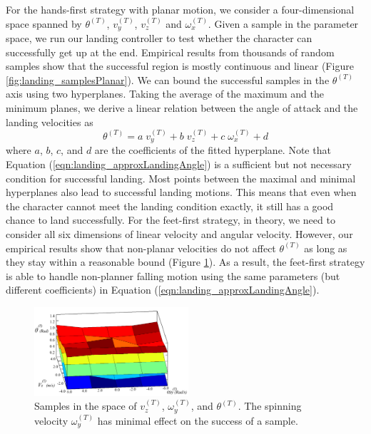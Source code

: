 For the hands-first strategy with planar motion, we consider a
four-dimensional space spanned by $\theta^{(T)}$, $v_y^{(T)}$,
$v_z^{(T)}$ and $\omega_x^{(T)}$. Given a sample in the parameter
space, we run our landing controller to test whether the character can
successfully get up at the end. Empirical results from thousands of
random samples show that the successful region is mostly continuous
and linear (Figure \ref{fig:landing_samplesPlanar}). We can bound the
successful samples in the $\theta^{(T)}$ axis using two hyperplanes.
Taking the average of the maximum and the minimum planes, we derive a
linear relation between the angle of attack and the landing velocities as
\begin{equation}
\label{eqn:landing_approxLandingAngle}
\theta ^{(T)} = a \;v_y^{(T)} + b \;v_z^{(T)} + c \;\omega_x^{(T)} + d
\end{equation}
where $a$, $b$, $c$, and $d$ are the coefficients of the fitted
hyperplane. Note that Equation (\ref{eqn:landing_approxLandingAngle}) is a
sufficient but not necessary condition for successful landing. Most
points between the maximal and minimal hyperplanes also lead to
successful landing motions. This means that even when the character
cannot meet the landing condition exactly, it still has a good chance
to land successfully. For the feet-first strategy, in theory, we need
to consider all six dimensions of linear velocity and angular
velocity. However, our empirical results show that non-planar
velocities do not affect $\theta^{(T)}$ as long as they stay within a
reasonable bound (Figure \ref{fig:landing_sampleNonPlanar}). As a result, the
feet-first strategy is able to handle non-planner falling motion using
the same parameters (but different coefficients) in Equation
(\ref{eqn:landing_approxLandingAngle}).

\begin{figure}[ht]
\center
  \includegraphics[width=0.51\textwidth]{images/sampleWYflat}
  \caption{
    Samples in the space of $v_z^{(T)}$, $\omega_y^{(T)}$, and
    $\theta^{(T)}$. The spinning velocity $\omega_y^{(T)}$
    has minimal effect on the success of a sample.
  }
 \label{fig:landing_sampleNonPlanar}
\end{figure}


